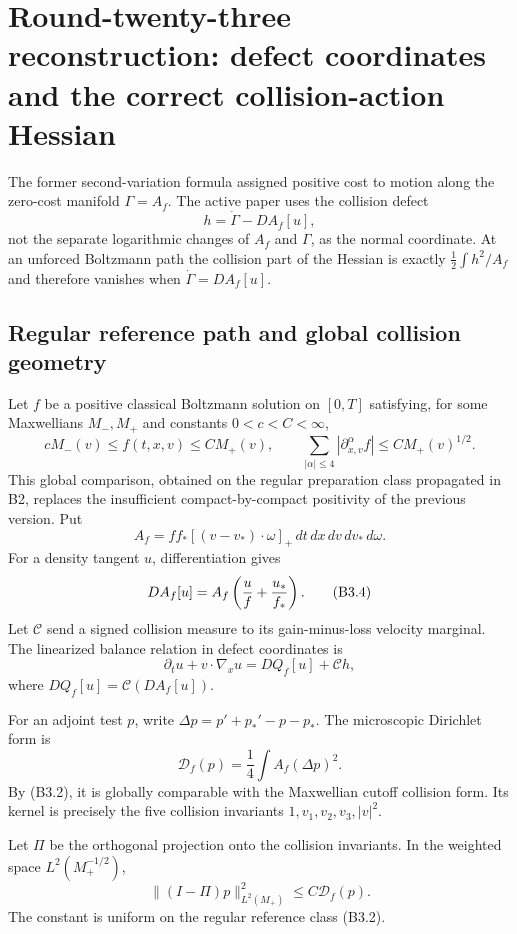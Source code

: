 \section{Round-twenty-three reconstruction: defect coordinates and the correct collision-action Hessian}
\label{sec:r23-b3}

The former second-variation formula assigned positive cost to motion along the
zero-cost manifold $\Gamma=A_f$.  The active paper uses the collision defect
\[
 h=\dot\Gamma-D A_f[u],                                  \tag{B3.1}
\]
not the separate logarithmic changes of $A_f$ and $\Gamma$, as the normal
coordinate.  At an unforced Boltzmann path the collision part of the Hessian is
exactly $\frac12\int h^2/A_f$ and therefore vanishes when
$\dot\Gamma=D A_f[u]$.

\subsection{Regular reference path and global collision geometry}

Let $f$ be a positive classical Boltzmann solution on $[0,T]$ satisfying, for
some Maxwellians $M_-,M_+$ and constants $0<c<C<\infty$,
\[
 cM_-(v)\le f(t,x,v)\le CM_+(v),
 \qquad
 \sum_{|\alpha|\le4}|\partial_{x,v}^\alpha f|
 \le C M_+(v)^{1/2}.                                    \tag{B3.2}
\]
This global comparison, obtained on the regular preparation class propagated
in B2, replaces the insufficient compact-by-compact positivity of the previous
version.  Put
\[
 A_f=f f_*[(v-v_*)\cdot\omega]_+
 \,dt\,dx\,dv\,dv_*\,d\omega.                           \tag{B3.3}
\]
For a density tangent $u$, differentiation gives
\[
 D A_f[u]=A_f\left({u\over f}+{u_*\over f_*}\right).     \tag{B3.4}
\]
Let $\mathcal C$ send a signed collision measure to its gain-minus-loss
velocity marginal.  The linearized balance relation in defect coordinates is
\[
 \partial_tu+v\cdot\nabla_xu
 =D Q_f[u]+\mathcal C h,                                  \tag{B3.5}
\]
where $DQ_f[u]=\mathcal C(D A_f[u])$.

For an adjoint test $p$, write
$\Delta p=p'+p_*'-p-p_*$.  The microscopic Dirichlet form is
\[
 \mathcal D_f(p)=\frac14\int A_f(\Delta p)^2.             \tag{B3.6}
\]
By (B3.2), it is globally comparable with the Maxwellian cutoff collision
form.  Its kernel is precisely the five collision invariants
$1,v_1,v_2,v_3,|v|^2$.

\begin{lemma}
\label{lem:r23-b3-gap}
Let $\Pi$ be the orthogonal projection onto the collision invariants.  In the
weighted space $L^2(M_+^{-1/2})$,
\[
 \|(I-\Pi)p\|_{L^2(M_+)}^2
 \le C\mathcal D_f(p).                                   \tag{B3.7}
\]
The constant is uniform on the regular reference class (B3.2).
\end{lemma}

